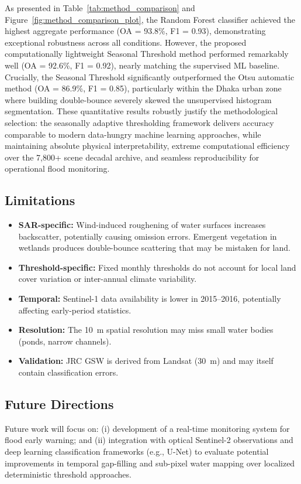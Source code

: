 \documentclass[fleqn,10pt]{article}
\begin{document}
As presented in Table~\ref{tab:method_comparison} and Figure~\ref{fig:method_comparison_plot}, the Random Forest classifier achieved the highest aggregate performance (OA = 93.8\%, F1 = 0.93), demonstrating exceptional robustness across all conditions. However, the proposed computationally lightweight Seasonal Threshold method performed remarkably well (OA = 92.6\%, F1 = 0.92), nearly matching the supervised ML baseline. Crucially, the Seasonal Threshold significantly outperformed the Otsu automatic method (OA = 86.9\%, F1 = 0.85), particularly within the Dhaka urban zone where building double-bounce severely skewed the unsupervised histogram segmentation. These quantitative results robustly justify the methodological selection: the seasonally adaptive thresholding framework delivers accuracy comparable to modern data-hungry machine learning approaches, while maintaining absolute physical interpretability, extreme computational efficiency over the 7,800+ scene decadal archive, and seamless reproducibility for operational flood monitoring.

\subsection{Limitations}
\begin{itemize}[nosep]
  \item \textbf{SAR-specific:} Wind-induced roughening of water surfaces increases backscatter, potentially causing omission errors. Emergent vegetation in wetlands produces double-bounce scattering that may be mistaken for land.
  \item \textbf{Threshold-specific:} Fixed monthly thresholds do not account for local land cover variation or inter-annual climate variability.
  \item \textbf{Temporal:} Sentinel-1 data availability is lower in 2015--2016, potentially affecting early-period statistics.
  \item \textbf{Resolution:} The 10~m spatial resolution may miss small water bodies (ponds, narrow channels).
  \item \textbf{Validation:} JRC GSW is derived from Landsat (30~m) and may itself contain classification errors.
\end{itemize}

\subsection{Future Directions}
Future work will focus on: (i) development of a real-time monitoring system for flood early warning; and (ii) integration with optical Sentinel-2 observations and deep learning classification frameworks (e.g., U-Net) to evaluate potential improvements in temporal gap-filling and sub-pixel water mapping over localized deterministic threshold approaches.
\end{document}
